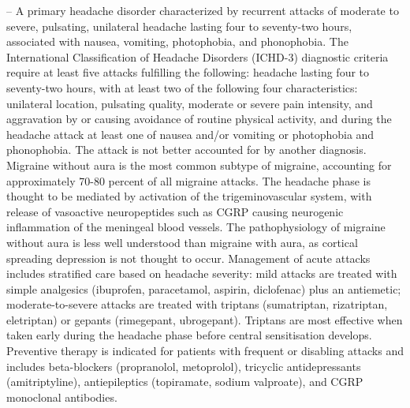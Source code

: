 -- A primary headache disorder characterized by recurrent attacks of moderate to severe, pulsating, unilateral headache lasting four to seventy-two hours, associated with nausea, vomiting, photophobia, and phonophobia. The International Classification of Headache Disorders (ICHD-3) diagnostic criteria require at least five attacks fulfilling the following: headache lasting four to seventy-two hours, with at least two of the following four characteristics: unilateral location, pulsating quality, moderate or severe pain intensity, and aggravation by or causing avoidance of routine physical activity, and during the headache attack at least one of nausea and/or vomiting or photophobia and phonophobia. The attack is not better accounted for by another diagnosis. Migraine without aura is the most common subtype of migraine, accounting for approximately 70-80 percent of all migraine attacks. The headache phase is thought to be mediated by activation of the trigeminovascular system, with release of vasoactive neuropeptides such as CGRP causing neurogenic inflammation of the meningeal blood vessels. The pathophysiology of migraine without aura is less well understood than migraine with aura, as cortical spreading depression is not thought to occur. Management of acute attacks includes stratified care based on headache severity: mild attacks are treated with simple analgesics (ibuprofen, paracetamol, aspirin, diclofenac) plus an antiemetic; moderate-to-severe attacks are treated with triptans (sumatriptan, rizatriptan, eletriptan) or gepants (rimegepant, ubrogepant). Triptans are most effective when taken early during the headache phase before central sensitisation develops. Preventive therapy is indicated for patients with frequent or disabling attacks and includes beta-blockers (propranolol, metoprolol), tricyclic antidepressants (amitriptyline), antiepileptics (topiramate, sodium valproate), and CGRP monoclonal antibodies.

